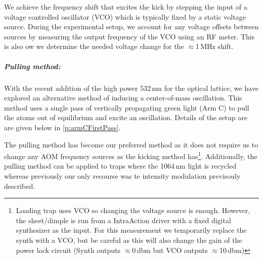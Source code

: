 We achieve the frequency shift that excites the kick by stepping the input of a voltage controlled oscillator (VCO) which is typically fixed by a static voltage source.
During the experimental setup, we account for any voltage offsets between sources by measuring the output frequency of the VCO using an RF meter.
This is also ow we determine the needed voltage change for the $\approx$1\,MHz shift.

\subparagraph{Pulling method:}
With the recent addition of the high power 532\,nm for the optical lattice, we have explored an alternative method of inducing a center-of-mass oscillation. 
This method uses a single pass of vertically propagating green light (Arm C) to pull the atoms out of equilibrium and excite an oscillation.
Details of the setup are are given below in \ref{p:armCFirstPass}.

The pulling method has become our preferred method as it does not require us to change any AOM frequency sources as the kicking method has\footnote{Loading trap uses VCO so changing the voltage source is enough. However, the sheet/dimple is run from a IntraAction driver with a fixed digital synthesizer as the input. For this measurement we temporarily replace the synth with a VCO, but be careful as this will also change the gain of the power lock circuit (Synth outputs $\approx$0\,dbm but VCO outputs $\approx$10\,dbm)}.
Additionally, the pulling method can be applied to traps where the 1064\,nm light is recycled whereas previously our only recourse was te intensity modulation previsouly described.

